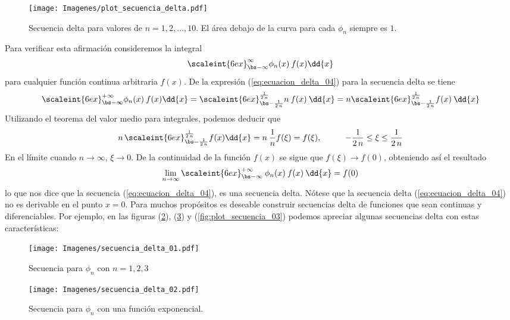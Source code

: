 \begin{figure}[H]
    \centering
    \texttt{[image: Imagenes/plot\_secuencia\_delta.pdf]}
    \caption{Secuencia delta para valores de $n = 1, 2, \ldots, 10$. El área debajo de la curva para cada $\phi_{n}$ siempre es $1$.}
    \label{fig:secuncia_delta_01}
\end{figure}
Para verificar esta afirmación consideremos la integral
\begin{align*}
\scaleint{6ex}_{\bs -\infty}^{\infty} \phi_{n} (x) \: f (x) \dd{x}
\end{align*}
para cualquier función continua arbitraria $f (x)$. De la expresión (\ref{eq:ecuacion_delta_04}) para la secuencia delta se tiene
\begin{align*}
\scaleint{6ex}_{\bs -\infty}^{+ \infty} \phi_{n} (x) \: f (x) \dd{x} = \scaleint{6ex}_{\bs -\frac{1}{2 \, n}}^{\frac{1}{2 \, n}} n \: f (x) \: \dd{x} = n \scaleint{6ex}_{\bs -\frac{1}{2 \, n}}^{\frac{1}{2 \, n}} f (x) \:  \dd{x}
\end{align*}
Utilizando el teorema del valor medio para integrales, podemos deducir que
\begin{align*}
n \, \scaleint{6ex}_{\bs -\frac{1}{2 \, n}}^{\frac{1}{2 \, n}} f (x) \dd{x} = n \: \dfrac{1}{n} f (\xi) = f (\xi), \hspace{1cm} - \dfrac{1}{2 \, n} \leq \xi \leq \dfrac{1}{2 \, n}
\end{align*}
En el límite cuando $n \to \infty$, $\xi \to 0$. De la continuidad de la función $f (x)$ se sigue que $f (\xi) \to f (0)$, obteniendo así el resultado
\begin{align*}
\lim_{n \to \infty} \scaleint{6ex}_{\bs -\infty}^{+ \infty} \: \phi_{n} (x) \: f (x) \: \dd{x} = f (0)
\end{align*}
lo que nos dice que la secuencia (\ref{eq:ecuacion_delta_04}), es una secuencia delta.
Nótese que la secuencia delta (\ref{eq:ecuacion_delta_04}) no es derivable en el punto $x = 0$. Para muchos propósitos es deseable construir secuencias delta de funciones que sean continuas y diferenciables. Por ejemplo, en las figuras (\ref{fig:plot_secuencia_01}), (\ref{fig:plot_secuencia_02}) y (\ref{fig:plot_secuencia_03}) podemos apreciar algunas secuencias delta con estas características:
\begin{figure}[H]
    \centering
    \texttt{[image: Imagenes/secuencia\_delta\_01.pdf]}
    \caption{Secuencia para $\phi_{n}$ con $n=1,2,3$}
    \label{fig:plot_secuencia_01}
\end{figure}
\begin{figure}[H]
    \centering
    \texttt{[image: Imagenes/secuencia\_delta\_02.pdf]}
    \caption{Secuencia para $\phi_{n}$ con una función exponencial.}
    \label{fig:plot_secuencia_02}
\end{figure}

